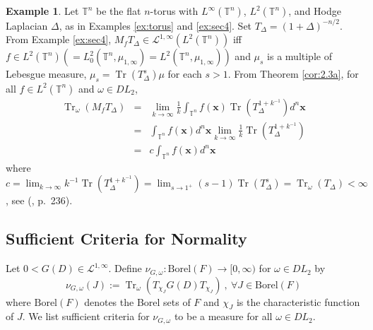 \documentclass[final,1p]{elsarticle}
\numberwithin{equation}{section}
\theoremstyle{plain}
\theoremstyle{definition}
\newtheorem{ex}[thm]{Example}
\begin{document}
\begin{ex} \label{ex:4.2}
Let ${\ensuremath{\mathbb{T}}}^n$ be the flat $n$-torus with $L^\infty({\ensuremath{\mathbb{T}}}^n)$, $L^2({\ensuremath{\mathbb{T}}}^n)$,
and Hodge Laplacian $\Delta$, as in Examples \ref{ex:torus} and \ref{ex:sec4}.  Set $T_\Delta = (1+\Delta)^{-n/2}$.
From Example \ref{ex:sec4}, $M_f T_\Delta \in \mathcal{L}^{1,\infty}(L^2({\ensuremath{\mathbb{T}}}^n))$ iff $f \in L^2({\ensuremath{\mathbb{T}}}^n) (=L^2_0({\ensuremath{\mathbb{T}}}^n,\mu_{1,\infty})=L^2({\ensuremath{\mathbb{T}}}^n,\mu_{1,\infty}))$ and $\mu_s$
is a multiple of Lebesgue measure, $\mu_s = \operatorname{Tr}(T_\Delta^s)\mu$
for each $s > 1$.
From Theorem \ref{cor:2.3a}, for all $f \in L^2({\ensuremath{\mathbb{T}}}^n)$ and $\omega \in DL_2$,
\begin{eqnarray*}
\operatorname{Tr}_{\omega}(M_f T_\Delta) & = & \lim_{k \to \infty} \frac{1}{k} \int_{{\ensuremath{\mathbb{T}}}^n} f(\mathbf{x}) \operatorname{Tr}(T_\Delta^{1+k^{-1}}) d^n\mathbf{x} \\
& = & \int_{{\ensuremath{\mathbb{T}}}^n} f(\mathbf{x})d^n\mathbf{x} \lim_{k \to \infty} \frac{1}{k} \operatorname{Tr}(T_\Delta^{1+k^{-1}}) \\
& = & c \int_{{\ensuremath{\mathbb{T}}}^n} f(\mathbf{x})d^n\mathbf{x}
\end{eqnarray*}
where $c = \lim_{k \to \infty} k^{-1} \operatorname{Tr}(T_\Delta^{1+k^{-1}}) = \lim_{s \to 1^+} (s-1) \operatorname{Tr}(T_\Delta^s) = \operatorname{Tr}_\omega(T_\Delta) < \infty$,
see (\cite{CM}, p.~236).
\end{ex}

\subsection{Sufficient Criteria for Normality} \label{sec:3}

\medskip Let $0 < G(D) \in \mathcal{L}^{1,\infty}$.  
Define $\nu_{G,\omega}: \text{Borel}(F) \to [0,\infty)$ for $\omega \in DL_2$
by
$$
\nu_{G,\omega}(J) := \operatorname{Tr}_\omega(T_{\chi_J}G(D)T_{\chi_J}) \ , \ {\ensuremath{\forall}} J \in \text{Borel}(F)
$$
where $\text{Borel}(F)$ denotes the Borel sets of $F$
and $\chi_J$ is the characteristic function of $J$.
We list sufficient criteria for $\nu_{G,\omega}$ to be a measure for all $\omega \in DL_2$.  
\end{document}
